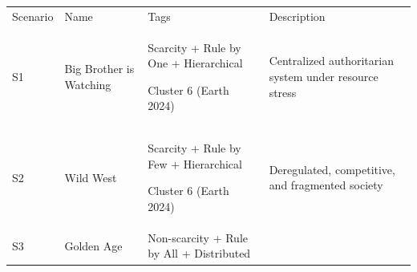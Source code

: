 {\def\LTcaptype{none} %
\begin{longtable}[]{@{}
  >{\raggedright\arraybackslash}p{}
  >{\raggedright\arraybackslash}p{}
  >{\raggedright\arraybackslash}p{}
  >{\raggedright\arraybackslash}p{}@{}}
\toprule\noalign{}
\begin{minipage}[b]{\linewidth}\raggedright
Scenario
\end{minipage} & \begin{minipage}[b]{\linewidth}\raggedright
Name
\end{minipage} & \begin{minipage}[b]{\linewidth}\raggedright
Tags
\end{minipage} & \begin{minipage}[b]{\linewidth}\raggedright
Description
\end{minipage} \\
\begin{minipage}[b]{\linewidth}\raggedright
S1
\end{minipage} & \begin{minipage}[b]{\linewidth}\raggedright
Big Brother is Watching
\end{minipage} & \begin{minipage}[b]{\linewidth}\raggedright
Scarcity + Rule by One + Hierarchical

Cluster 6 (Earth 2024)
\end{minipage} & \begin{minipage}[b]{\linewidth}\raggedright
Centralized authoritarian system under resource stress
\end{minipage} \\
\begin{minipage}[b]{\linewidth}\raggedright
S2
\end{minipage} & \begin{minipage}[b]{\linewidth}\raggedright
Wild West
\end{minipage} & \begin{minipage}[b]{\linewidth}\raggedright
Scarcity + Rule by Few + Hierarchical

Cluster 6 (Earth 2024)
\end{minipage} & \begin{minipage}[b]{\linewidth}\raggedright
Deregulated, competitive, and fragmented society
\end{minipage} \\
\begin{minipage}[b]{\linewidth}\raggedright
S3
\end{minipage} & \begin{minipage}[b]{\linewidth}\raggedright
Golden Age
\end{minipage} & \begin{minipage}[b]{\linewidth}\raggedright
Non-scarcity + Rule by All + Distributed


\end{minipage}
\end{longtable}}
